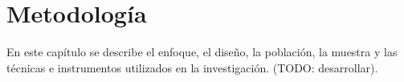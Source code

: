 
\chapter{Metodología}

\label{cap:metodologia}

En este capítulo se describe el enfoque, el diseño, la población,
la muestra y las técnicas e instrumentos utilizados en la investigación.
(TODO: desarrollar).

 

